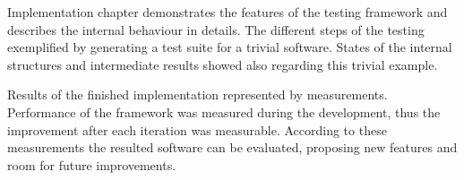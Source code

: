 Implementation chapter demonstrates the features of the testing framework and describes the internal behaviour in details. The different steps of the testing exemplified by generating a test suite for a trivial software. States of the internal structures and intermediate results showed also regarding this trivial example.

Results of the finished implementation represented by measurements. Performance of the framework was measured during the development, thus the improvement after each iteration was measurable. According to these measurements the resulted software can be evaluated, proposing new features and room for future improvements.

\vfill
\dolgozatnyelve
{}

\setcounter{romanPage}{\value{page}}

